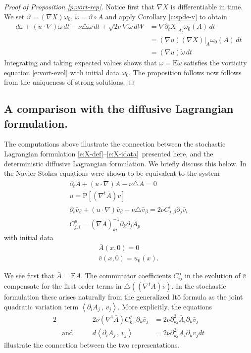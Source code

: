 \documentclass[final]{amsart}%
\newcommand{\snseqns}{\eqref{e:X-def}--\eqref{e:X-idata}}
\newcommand{\del}{\partial}
\newcommand{\lap}{\triangle}
\newcommand{\inv}{^{-1}}
\newcommand{\transpose}{^\text{t}}
\newcommand{\grad}{\nabla}
\newcommand{\gradt}{\grad\transpose}
\newcommand{\E}{\boldsymbol{\mathrm{E}}}
\newcommand{\lhp}{\boldsymbol{\mathrm{P}}}
\newcommand{\at}[1]{\big|_{#1}}
\newcommand{\D}[2][u]{\del_t #2 + \left(#1 \cdot \grad\right) #2 - \nu \lap #2}
\newif\iftextstyle
\newcommand{\qv}[2]{\iftextstyle\langle#1,#2\rangle\else\left\langle#1\,,\,#2\right\rangle\fi}
\numberwithin{equation}{section}
\theoremstyle{definition}
\theoremstyle{remark}
\begin{document}
\begin{proof}[Proof of Proposition \ref{p:vort-rep}]%
Notice first that $\grad X$ is differentiable in time. We set $\vartheta = (\grad X) \omega_0$, $\tilde{\omega} = \vartheta \circ A$ and apply Corollary \ref{c:spde-v} to obtain
\begin{align*}
d\tilde{\omega} + (u \cdot \grad) \tilde{\omega} \, dt - \nu \lap \tilde{\omega}\, dt + \sqrt{2\nu} \grad \tilde{\omega}\, dW &= \grad \del_t X\at{A_t} \omega_0(A) \,dt\\
    &= (\grad u) (\grad X)\at A \omega_0(A) \, dt\\
    &= (\grad u) \tilde{\omega} \,dt
\end{align*}
Integrating and taking expected values shows that $\omega = \E \tilde{\omega}$ satisfies the vorticity equation \eqref{e:vort-evol} with initial data $\omega_0$. The proposition follows now follows from the uniqueness of strong solutions.
\end{proof}
\subsection{A comparison with the diffusive Lagrangian formulation.}%
The computations above illustrate the connection between the stochastic Lagrangian formulation \snseqns\ presented here, and the deterministic diffusive Lagrangian formulation. We briefly discuss this below. In \cite{elns} the Navier-Stokes equations were shown to be equivalent to the system
\begin{gather*}
\D{\bar{A}} = 0\\
u = \lhp[ (\gradt \bar{A}) v]\\
\D{\bar{v}_\beta} = 2 \nu C^i_{j,\beta} \del_j \bar{v}_i\\
C^p_{j,i} = (\grad \bar{A})\inv_{ki} \del_k \del_j \bar{A}_p
\end{gather*}
with initial data
\begin{gather*}
\bar{A}(x,0) = 0\\
\bar{v}(x,0) = u_0(x).
\end{gather*}

We see first that $\bar{A} = \E A$. The commutator coefficients $C^\alpha_{ij}$ in the evolution of $\bar{v}$ compensate for the first order terms in $\lap ( (\gradt \bar{A}) \bar{v} )$. In the stochastic formulation these arises naturally from the generalized It\^o formula as the joint quadratic variation term $\qv{ \del_i A_j}{ v_j}$. More explicitly, the equations
\begin{alignat*}{2}
&&	2\nu (\gradt \bar{A}) C^j_{k, \cdot} \del_k \bar{v}_j &= 2\nu \del^2_{kj} \bar{A}_i \del_k \bar{v}_j\\
&\text{and}\qquad& d\qv{\del_i A_j}{ v_j} &= 2\nu \del^2_{kj} A_i \del_k v_j dt
\end{alignat*}
illustrate the connection between the two representations.
\end{document}
